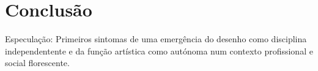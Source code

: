 \documentclass{article}
\begin{document}
\section{Conclusão}

Especulação: Primeiros sintomas de uma emergência do desenho como
disciplina independentente e da função artística como autónoma num
contexto profissional e social florescente.

\printbibliography[heading=bibliography,title={Bibliografia},type=book]
\printbibliography[heading=subbibliography,title={Reproduções},type=artwork]
\end{document}
